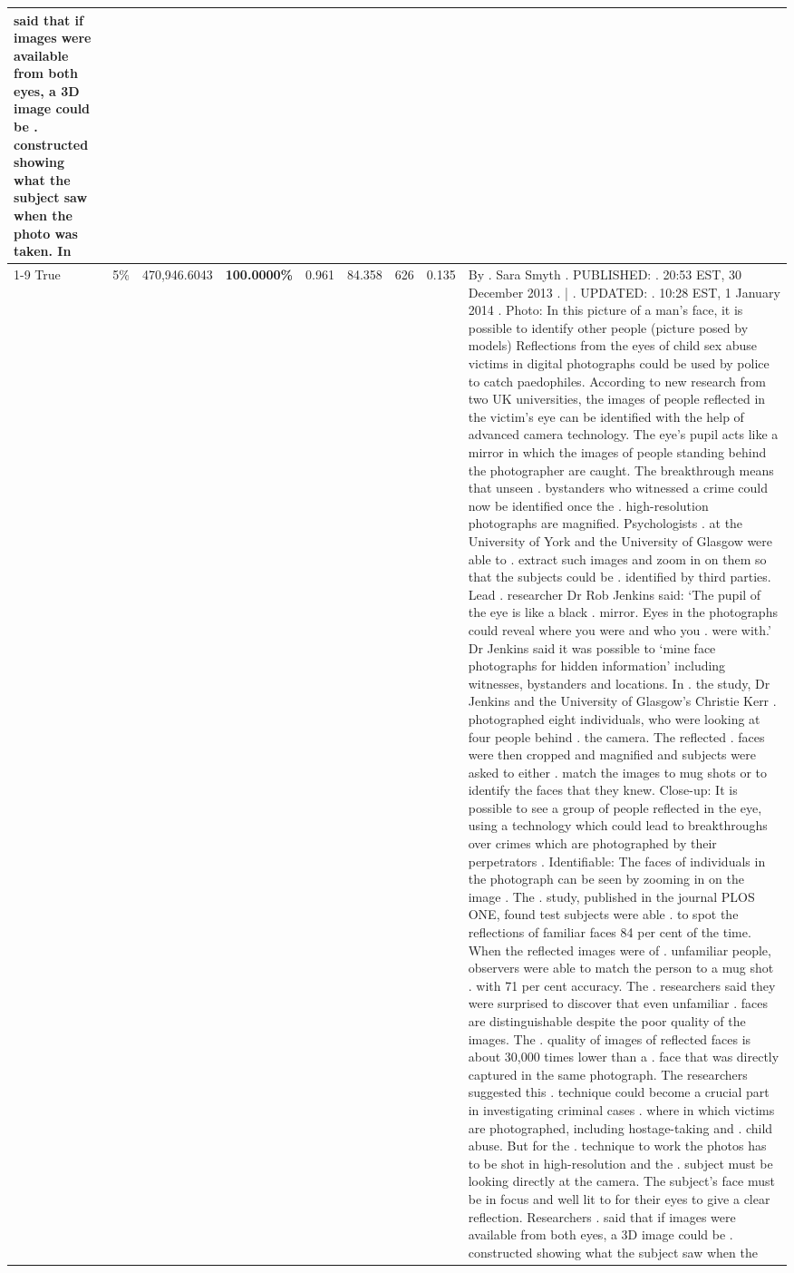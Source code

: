 \begin{table}[H]
\begin{tabular}{lllrlllll}
said that if images were available from both eyes, a 3D image could be . constructed showing what the subject saw when the photo was taken. In \\
\cline{1-9} \cline{2-9}
True & 5\% & 470,946.6043 & \bfseries \color{red} 100.0000\% & 0.961 & 84.358 & 626 & 0.135 & By . Sara Smyth . PUBLISHED: . 20:53 EST, 30 December 2013 . | . UPDATED: . 10:28 EST, 1 January 2014 . Photo: In this picture of a man's face, it is possible to identify other people (picture posed by models) Reflections from the eyes of child sex abuse victims in digital photographs could be used by police to catch paedophiles. According to new research from two UK universities, the images of people reflected in the victim's eye can be identified with the help of advanced camera technology. The eye's pupil acts like a mirror in which the images of people standing behind the photographer are caught. The breakthrough means that unseen . bystanders who witnessed a crime could now be identified once the . high-resolution photographs are magnified. Psychologists . at the University of York and the University of Glasgow were able to . extract such images and zoom in on them so that the subjects could be . identified by third parties. Lead . researcher Dr Rob Jenkins said: ‘The pupil of the eye is like a black . mirror. Eyes in the photographs could reveal where you were and who you . were with.' Dr Jenkins said it was possible to ‘mine face photographs for hidden information' including witnesses, bystanders and locations. In . the study, Dr Jenkins and the University of Glasgow's Christie Kerr . photographed eight individuals, who were looking at four people behind . the camera. The reflected . faces were then cropped and magnified and subjects were asked to either . match the images to mug shots or to identify the faces that they knew. Close-up: It is possible to see a group of people reflected in the eye, using a technology which could lead to breakthroughs over crimes which are photographed by their perpetrators . Identifiable: The faces of individuals in the photograph can be seen by zooming in on the image . The . study, published in the journal PLOS ONE, found test subjects were able . to spot the reflections of familiar faces 84 per cent of the time. When the reflected images were of . unfamiliar people, observers were able to match the person to a mug shot . with 71 per cent accuracy. The . researchers said they were surprised to discover that even unfamiliar . faces are distinguishable despite the poor quality of the images. The . quality of images of reflected faces is about 30,000 times lower than a . face that was directly captured in the same photograph. The researchers suggested this . technique could become a crucial part in investigating criminal cases . where in which victims are photographed, including hostage-taking and . child abuse. But for the . technique to work the photos has to be shot in high-resolution and the . subject must be looking directly at the camera. The subject's face must be in focus and well lit to for their eyes to give a clear reflection. Researchers . said that if images were available from both eyes, a 3D image could be . constructed showing what the subject saw when the 
\end{tabular}
\end{table}
